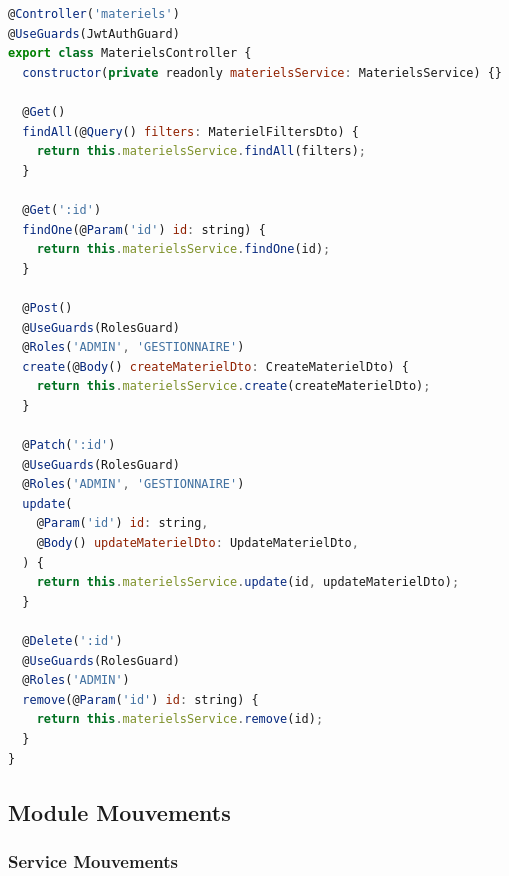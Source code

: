 \begin{lstlisting}[language=JavaScript, caption=materiels.controller.ts (extrait)]
@Controller('materiels')
@UseGuards(JwtAuthGuard)
export class MaterielsController {
  constructor(private readonly materielsService: MaterielsService) {}

  @Get()
  findAll(@Query() filters: MaterielFiltersDto) {
    return this.materielsService.findAll(filters);
  }

  @Get(':id')
  findOne(@Param('id') id: string) {
    return this.materielsService.findOne(id);
  }

  @Post()
  @UseGuards(RolesGuard)
  @Roles('ADMIN', 'GESTIONNAIRE')
  create(@Body() createMaterielDto: CreateMaterielDto) {
    return this.materielsService.create(createMaterielDto);
  }

  @Patch(':id')
  @UseGuards(RolesGuard)
  @Roles('ADMIN', 'GESTIONNAIRE')
  update(
    @Param('id') id: string,
    @Body() updateMaterielDto: UpdateMaterielDto,
  ) {
    return this.materielsService.update(id, updateMaterielDto);
  }

  @Delete(':id')
  @UseGuards(RolesGuard)
  @Roles('ADMIN')
  remove(@Param('id') id: string) {
    return this.materielsService.remove(id);
  }
}
\end{lstlisting}

\subsection{Module Mouvements}

\subsubsection{Service Mouvements}

